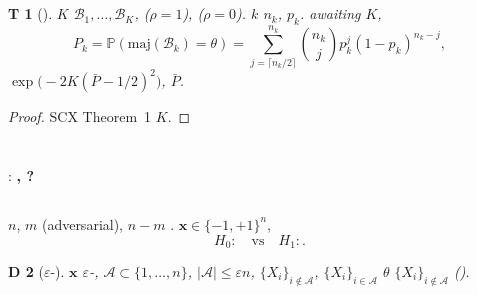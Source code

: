 \documentclass[11pt,a4paper]{article}
\newtheorem{theorem}Theorem[section]
\newtheorem{definition}[theorem]Definition
\renewcommand{\P}{\mathbb{P}}
\newcommand{\xv}{\mathbf{x}}
\begin{document}
\subsection{}
\begin{theorem}[]
\label{thm:blockdiag}
 $K$ $\mathcal{B}_1,\ldots,\mathcal{B}_K$, 
($\rho=1$), ($\rho=0$).
 $k$ $n_k$, $p_k$.
awaiting $K$, 
\begin{equation}
 P_k = \P(\text{maj}(\mathcal{B}_k) = \theta)
 = \sum_{j=\lceil n_k/2 \rceil}^{n_k} \binom{n_k}{j} p_k^j (1-p_k)^{n_k-j},
\end{equation}
 $\exp\bigl(-2K(\bar{P} - 1/2)^2\bigr)$, 
 $\bar{P}$.
\end{theorem}
\begin{proof}
 SCX Theorem~1 $K$.
\end{proof}
\section{}
: \textbf{, ?}
\subsection{}
 $n$, $m$ \emph{}(adversarial), 
 $n-m$ \emph{}.
 $\xv \in \{-1,+1\}^n$, 
\[
 H_0: \text{} \quad\text{vs}\quad
 H_1: \text{}.
\]
\begin{definition}[$\varepsilon$-]
 $\xv$ $\varepsilon$-\emph{}, 
$\mathcal{A} \subset \{1,\ldots,n\}$, $|\mathcal{A}| \leq \varepsilon n$, 
 $\{X_i\}_{i \notin \mathcal{A}}$, 
 $\{X_i\}_{i \in \mathcal{A}}$ $\theta$ $\{X_i\}_{i \notin \mathcal{A}}$ ().
\end{definition}
\end{document}
